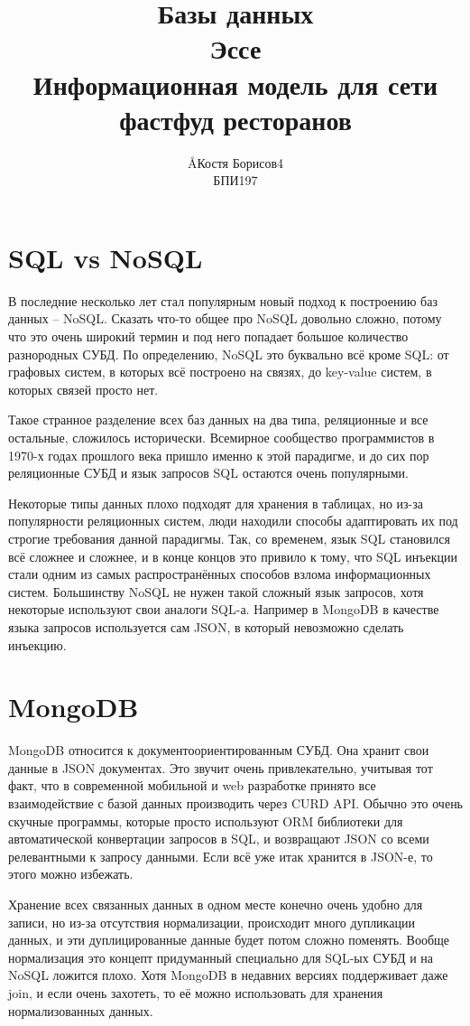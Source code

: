 \documentclass[12pt]{article}
\title{Базы данных \\ Эссе \\ Информационная модель для сети фастфуд ресторанов}
\author{\AA{Костя Борисов}{4} \\ БПИ197}
\begin{document}
  \maketitle

  \section{SQL vs NoSQL}
  В последние несколько лет стал популярным новый подход к построению баз данных -- NoSQL.
  Сказать что-то общее про NoSQL довольно сложно, потому что это очень широкий термин
  и под него попадает большое количество разнородных СУБД.
  По определению, NoSQL это буквально всё кроме SQL:
  от графовых систем, в которых всё построено на связях, до key-value систем, в которых связей просто нет.

  Такое странное разделение всех баз данных на два типа, реляционные и все остальные, сложилось исторически.
  Всемирное сообщество программистов в 1970-х годах прошлого века пришло именно к этой парадигме,
  и до сих пор реляционные СУБД и язык запросов SQL остаются очень популярными.

  Некоторые типы данных плохо подходят для хранения в таблицах, но из-за популярности реляционных систем,
  люди находили способы адаптировать их под строгие требования данной парадигмы.
  Так, со временем, язык SQL становился всё сложнее и сложнее, и в конце концов это привило к тому,
  что SQL инъекции стали одним из самых распространённых способов взлома информационных систем.
  Большинству NoSQL не нужен такой сложный язык запросов, хотя некоторые используют свои аналоги SQL-а.
  Например в MongoDB в качестве языка запросов используется сам JSON, в который невозможно сделать инъекцию.

  \section{MongoDB}
  MongoDB относится к документоориентированным СУБД.
  Она хранит свои данные в JSON документах.
  Это звучит очень привлекательно, учитывая тот факт,
  что в современной мобильной и web разработке принято все взаимодействие с базой данных производить через CURD API.
  Обычно это очень скучные программы, которые просто используют ORM библиотеки для автоматической конвертации запросов в SQL,
  и возвращают JSON со всеми релевантными к запросу данными.
  Если всё уже итак хранится в JSON-е, то этого можно избежать.

  Хранение всех связанных данных в одном месте конечно очень удобно для записи,
  но из-за отсутствия нормализации, происходит много дупликации данных, и эти дуплицированные данные будет потом сложно поменять.
  Вообще нормализация это концепт придуманный специально для SQL-ых СУБД и на NoSQL ложится плохо.
  Хотя MongoDB в недавних версиях поддерживает даже join, и если очень захотеть,
  то её можно использовать для хранения нормализованных данных.
\end{document}
